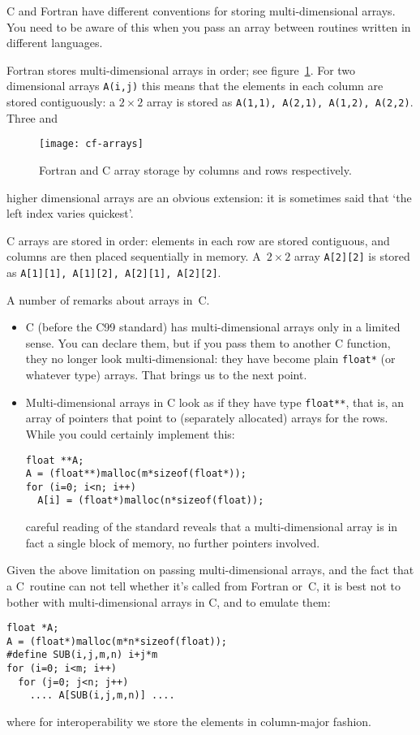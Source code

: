 C and Fortran have different conventions for storing multi-dimensional
arrays. You need to be aware of this when you pass an array between
routines written in different languages. 

Fortran stores multi-dimensional arrays in 
order; see figure~\ref{fig:cf-arrays}.
For two dimensional arrays \texttt{A(i,j)} this means that
the elements in each column are stored contiguously: a $2\times2$
array is stored as \texttt{A(1,1), A(2,1), A(1,2), A(2,2)}. Three and
\begin{figure}[ht]
  \texttt{[image: cf-arrays]}
  \caption{Fortran and C array storage by columns and rows respectively.}
  \label{fig:cf-arrays}
\end{figure}
higher dimensional arrays are an obvious extension: it is sometimes
said that `the left index varies quickest'.

C arrays are stored in  order: elements in each
row are stored contiguous, and columns are then placed sequentially in
memory. A~$2\times2$ array \texttt{A[2][2]} is stored as
\texttt{A[1][1], A[1][2], A[2][1], A[2][2]}. 

A number of remarks about arrays in~C.
\begin{itemize}
\item C (before the C99 standard) has multi-dimensional arrays only in
  a limited sense. You can declare them, but if you pass them to another
  C function, they no longer look multi-dimensional: they have become
  plain \texttt{float*} (or whatever type) arrays. That brings us to
  the next point.
\item Multi-dimensional arrays in C look as if they have type
  \texttt{float**}, that is, an array of pointers that point to
  (separately allocated) arrays for the rows. While you could
  certainly implement this:
\begin{verbatim}
float **A;
A = (float**)malloc(m*sizeof(float*));
for (i=0; i<n; i++)
  A[i] = (float*)malloc(n*sizeof(float));
\end{verbatim}
  careful reading of the standard reveals that a multi-dimensional
  array is in fact a single block of memory, no further pointers
  involved.
\end{itemize}
Given the above limitation on passing multi-dimensional arrays, and
the fact that a C~routine can not tell whether it's called from
Fortran or~C, it is best not to bother with multi-dimensional arrays
in C, and to emulate them:
\begin{verbatim}
float *A;
A = (float*)malloc(m*n*sizeof(float));
#define SUB(i,j,m,n) i+j*m
for (i=0; i<m; i++)
  for (j=0; j<n; j++)
    .... A[SUB(i,j,m,n)] ....
\end{verbatim}
where for interoperability we store the elements in column-major fashion.

